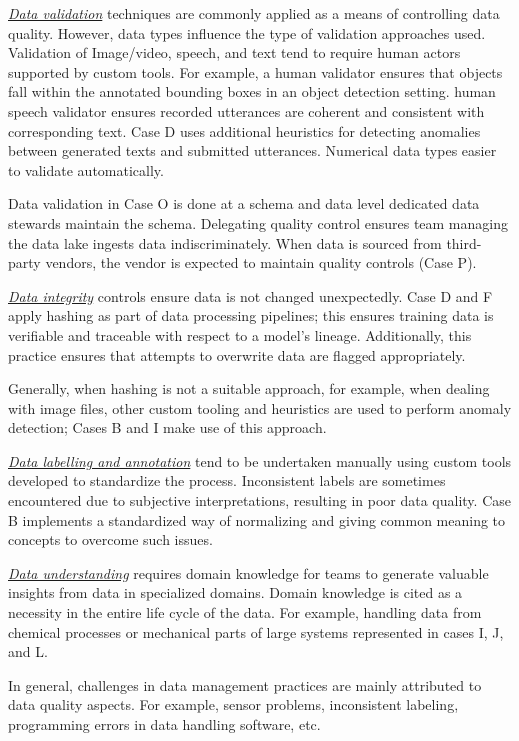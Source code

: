 \underline{\emph{Data validation}} techniques are commonly applied as a means of controlling data quality. However, data types influence the type of validation approaches used. Validation of Image/video, speech, and text tend to require human actors supported by custom tools. For example, a human validator ensures that objects fall within the annotated bounding boxes in an object detection setting. \DIFdelbegin {}\DIFdelend \DIFaddbegin {}\DIFaddend human speech validator ensures recorded utterances are coherent and consistent with corresponding text. Case D uses additional heuristics for detecting anomalies between generated texts and submitted utterances. Numerical data types \DIFdelbegin {}\DIFdelend \DIFaddbegin {}\DIFaddend easier to validate automatically.

Data validation in Case O is done at a schema and data level \DIFdelbegin {}\DIFdelend \DIFaddbegin {}\DIFaddend dedicated data stewards maintain the schema. Delegating quality control ensures \DIFdelbegin {}\DIFdelend \DIFaddbegin {}\DIFaddend team managing the data lake ingests data indiscriminately. When data is sourced from third-party vendors, the vendor is expected to maintain quality controls (Case P).


\underline{\emph{Data integrity}}
controls ensure data is not changed unexpectedly. Case D and F apply hashing as part of \DIFaddbegin {}\DIFaddend data processing pipelines; this ensures training data is verifiable and traceable with respect to a model's lineage. Additionally, this practice ensures that attempts to overwrite data are flagged appropriately.

Generally, when hashing is not a suitable approach, for example, when dealing with image files, other custom tooling and heuristics are used to perform anomaly detection; Cases B and I make use of this approach.

\underline{\emph{Data labelling and annotation}} tend to be undertaken manually using custom tools developed to standardize the process. Inconsistent labels are sometimes encountered due to subjective interpretations, resulting in poor data quality. Case B implements a standardized way of normalizing and giving common meaning to concepts to overcome such issues. 

\underline{\emph{Data understanding}} requires domain knowledge for teams to generate valuable insights from data in specialized domains. Domain knowledge is cited as a necessity in the entire life cycle of the data. For example, handling data from chemical processes or mechanical parts of large systems \DIFdelbegin {}\DIFdelend \DIFaddbegin {}\DIFaddend represented in cases I, J, and L.

In general, challenges in data management practices are mainly attributed to data quality aspects. For example, sensor \DIFaddbegin {}\DIFaddend problems, inconsistent labeling, programming errors in data handling software, etc. \DIFdelbegin %

\DIFdelend